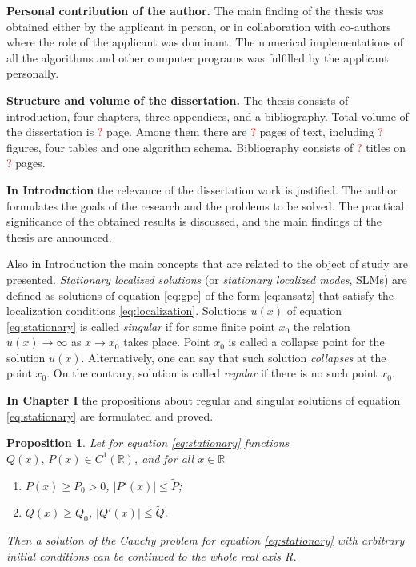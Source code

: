 \documentclass[candidate, href, colorlinks]{disser}
\newtheorem{proposition}{Proposition}
\begin{document}
\textbf{Personal contribution of the author.}
The main finding of the thesis was obtained either by the applicant in person, or in collaboration with co-authors where the role of the applicant was dominant.
The numerical implementations of all the algorithms and other computer programs was fulfilled by the applicant personally.

\textbf{Structure and volume of the dissertation.}
The thesis consists of introduction, four chapters, three appendices, and a bibliography.
Total volume of the dissertation is \textcolor{red}{?} page.
Among them there are \textcolor{red}{?} pages of text, including \textcolor{red}{?} figures, four tables and one algorithm schema.
Bibliography consists of \textcolor{red}{?} titles on \textcolor{red}{?} pages.


\textbf{In Introduction} the relevance of the dissertation work is justified.
The author formulates the goals of the research and the problems to be solved.
The practical significance of the obtained results is discussed, and the main findings of the thesis are announced.

Also in Introduction the main concepts that are related to the object of study are presented.
{\it Stationary localized solutions} (or {\it stationary localized modes}, SLMs) are defined as solutions of equation \eqref{eq:gpe} of the form \eqref{eq:ansatz} that satisfy the localization conditions \eqref{eq:localization}.
Solutions $u(x)$ of equation \eqref{eq:stationary} is called  {\it singular} if for some finite point $x_0$ the relation $u(x) \to \infty$ as $x \to x_0$ takes place.
Point $x_0$ is called a collapse point for the solution $u(x)$.
Alternatively, one can say that such solution {\it collapses} at the point $x_0$.
On the contrary, solution is called {\it regular} if there is no such point $x_0$.

\textbf{In Chapter I} the propositions about regular and singular solutions of equation \eqref{eq:stationary} are formulated and proved.

\begin{proposition}
\label{prop:absense-of-singular-solutions}
	Let for equation \eqref{eq:stationary} functions $Q(x), \, P(x) \in C^1(\mathbb{R})$, and for all $x \in \mathbb{R}$
	\begin{enumerate}
		\item[(a)] $P(x) \ge P_0 > 0$, $|P'(x)| \le \widetilde{P}$;
		\item[(b)] $Q(x) \ge Q_0$, $|Q'(x)| \le \widetilde{Q}$.
	\end{enumerate}
	Then a solution of the Cauchy problem for equation \eqref{eq:stationary} with arbitrary initial condi­tions can be continued to the whole real axis R.
\end{proposition}
\end{document}
